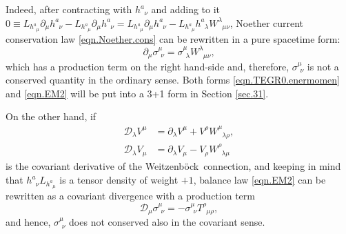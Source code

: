 \documentclass[
10pt, %
a4paper, %
oneside, %
twocolumn,
headinclude,footinclude, %
BCOR5mm, %
]{scrartcl}
\newcommand{\pd}[1]{\partial_{#1}}
\newcommand{\tetrsymbol}{h}
\newcommand{\tetr}[2]{\tetrsymbol^{#1}_{\phantom{#1}#2}}
\newcommand{\DW}[1]{\mathcal{D}_{#1}} %
\newcommand{\Tors}[2]{T^{#1}_{\phantom{#1}#2}}
\newcommand{\w}[2]{W^{#1}_{\phantom{#1}#2}}
\newcommand{\We}{Weitzenb\"ock}
\newcommand{\Laghodge}{L}%
\newcommand{\EMmat}[2]{\sigma^{#1}_{\ \,#2}}
\newcommand{\mat}[1]{\prescript{\text{(m)}}{}{\hspace{-0.1cm}#1}}
\newcommand{\gra}[1]{\prescript{\text{(g)}}{}{\hspace{-0.1cm}#1}}
\newcommand{\HDT}[1]{\accentset{\star}{T}^{#1}}
\begin{document}
	Indeed, after contracting with $ \tetr{a}{\nu} $ and adding to it $ 0\equiv
	\Laghodge_{\tetr{a}{\mu}}\pd{\mu} \tetr{a}{\nu} -
	\Laghodge_{\tetr{a}{\mu}}\pd{\mu} \tetr{a}{\nu}  =
	\Laghodge_{\tetr{a}{\mu}}\pd{\mu} \tetr{a}{\nu} - \Laghodge_{\tetr{a}{\mu}}
	\tetr{a}{\lambda}\w{\lambda}{\mu\nu} $, Noether current conservation law
	\eqref{eqn.Noether.cons} can be rewritten in a pure spacetime form:	
	\begin{equation}\label{eqn.EM2}
		\pd{\mu}\EMmat{\mu}{\nu} = \EMmat{\mu}{\lambda} 
		\w{\lambda}{\mu\nu},
	\end{equation}
	which has a production term on the right hand-side and, therefore, $
	\EMmat{\mu}{\nu} $ is not a conserved quantity in the ordinary sense.
	Both forms \eqref{eqn.TEGR0.enermomen} and \eqref{eqn.EM2} will be put into a 3+1 form in Section \ref{sec.31}.

	On the other hand, if 
	\begin{subequations}
		\begin{align}\label{eqn.cov.W}
			\DW{\lambda} V^{\mu} &= \pd{\lambda} V^\mu + V^\rho \w{\mu}{\lambda\rho}, 
			\\[2mm] 
			\DW{\lambda} V_{\mu} &= \pd{\lambda} V_\mu - V_\rho \w{\rho}{\lambda\mu}
		\end{align}
	\end{subequations}
	is the covariant derivative of the \We\ connection, and 
	keeping in mind that $ \tetr{a}{\nu}\Laghodge_{\tetr{a}{\mu}} $ is a tensor density of weight $ 
	+1 
	$, balance law \eqref{eqn.EM2} can be rewritten as a covariant divergence with a production term
	\begin{equation*}\label{eqn.EM.cov}
		\DW{\mu}\EMmat{\mu}{\nu} = -\EMmat{\mu}{\nu} \Tors{\rho}{\mu\rho},
	\end{equation*}
	and hence, $ \EMmat{\mu}{\nu} $ does not conserved also in the covariant sense.
	
	
\end{document}
